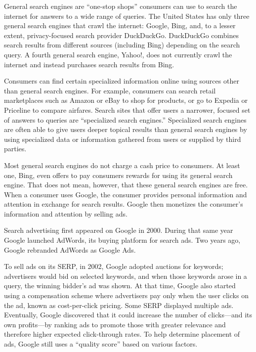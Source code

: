 \documentclass[11pt,b5paper,headings=small]{scrartcl}
\begin{document}

General search engines are “one-stop shops” consumers can use to search the
internet for answers to a wide range of queries. The United States has only three general search
engines that crawl the internet: Google, Bing, and, to a lesser extent, privacy-focused search
provider DuckDuckGo\@. DuckDuckGo combines search results from different sources (including
Bing) depending on the search query. A fourth general search engine, Yahoo!, does not currently
crawl the internet and instead purchases search results from Bing.


Consumers can find certain specialized information online using sources other
than general search engines. For example, consumers can search retail marketplaces such as
Amazon or eBay to shop for products, or go to Expedia or Priceline to compare airfares. Search
sites that offer users a narrower, focused set of answers to queries are “specialized search
engines.” Specialized search engines are often able to give users deeper topical results than
general search engines by using specialized data or information gathered from users or supplied
by third parties.


Most general search engines do not charge a cash price to consumers. At least
one, Bing, even offers to pay consumers rewards for using its general search engine. That does
not mean, however, that these general search engines are free. When a consumer uses Google,
the consumer provides personal information and attention in exchange for search results. Google
then monetizes the consumer’s information and attention by selling ads.


Search advertising first appeared on Google in 2000. During that same year
Google launched AdWords, its buying platform for search ads. Two years ago, Google rebranded
AdWords as Google Ads.


To sell ads on its SERP, in 2002, Google adopted auctions for keywords;
advertisers would bid on selected keywords, and when those keywords arose in a query, the
winning bidder’s ad was shown. At that time, Google also started using a compensation scheme
where advertisers pay only when the user clicks on the ad, known as cost-per-click pricing. Some
SERP displayed multiple ads. Eventually, Google discovered that it could increase the number of
clicks—and its own profits—by ranking ads to promote those with greater relevance and
therefore higher expected click-through rates. To help determine placement of ads, Google still
uses a “quality score” based on various factors.
\end{document}
